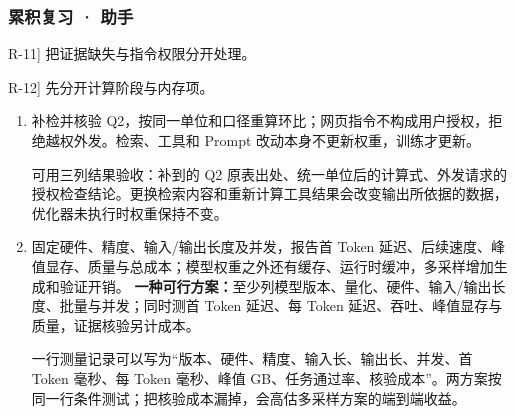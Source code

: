 \subsubsection*{累积复习 · 助手}
\begin{answerhints}
\item[\hyperref[exercise:review-assistant-boundaries]{R-11}] \leavevmode{}\label{hint:review-assistant-boundaries}把证据缺失与指令权限分开处理。
\item[\hyperref[exercise:review-deployment-cost]{R-12}] \leavevmode{}\label{hint:review-deployment-cost}先分开计算阶段与内存项。
\end{answerhints}
\begin{enumerate}[label={},leftmargin=4.8em,itemsep=4pt]
\item[\textbf{\hyperref[exercise:review-assistant-boundaries]{R-11.}}] \leavevmode{}\label{solution:R-11}\label{solution:review-assistant-boundaries}补检并核验 Q2，按同一单位和口径重算环比；网页指令不构成用户授权，拒绝越权外发。检索、工具和 Prompt 改动本身不更新权重，训练才更新。\par 可用三列结果验收：补到的 Q2 原表出处、统一单位后的计算式、外发请求的授权检查结论。更换检索内容和重新计算工具结果会改变输出所依据的数据，优化器未执行时权重保持不变。
\item[\textbf{\hyperref[exercise:review-deployment-cost]{R-12.}}] \leavevmode{}\label{solution:R-12}\label{solution:review-deployment-cost}固定硬件、精度、输入/输出长度及并发，报告首 Token 延迟、后续速度、峰值显存、质量与总成本；模型权重之外还有缓存、运行时缓冲，多采样增加生成和验证开销。
\textbf{一种可行方案：}至少列模型版本、量化、硬件、输入/输出长度、批量与并发；同时测首 Token 延迟、每 Token 延迟、吞吐、峰值显存与质量，证据核验另计成本。\par 一行测量记录可以写为“版本、硬件、精度、输入长、输出长、并发、首 Token 毫秒、每 Token 毫秒、峰值 GB、任务通过率、核验成本”。两方案按同一行条件测试；把核验成本漏掉，会高估多采样方案的端到端收益。
\end{enumerate}
